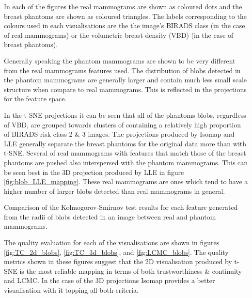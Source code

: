 In each of the figures the real mammograms are shown as coloured dots and the breast phantoms are shown as coloured triangles. The labels corresponding to the colours used in each visualisations are the the image's BIRADS class (in the case of real mammograms) or the volumetric breast density (VBD) (in the case of breast phantoms).

Generally speaking the phantom mammograms are shown to be very different from the real mammograms features used. The distribution of blobs detected in the phantom mammograms are generally larger and contain much less small scale structure when compare to real mammograms. This is reflected in the projections for the feature space. 

In the t-SNE projections it can be seen that all of the phantoms blobs, regardless of VBD, are grouped towards clusters of containing a relatively high proportion of BIRADS risk class 2 \& 3 images. The projections produced by Isomap and LLE generally separate the breast phantoms for the original data more than with t-SNE. Several of real mammograms with features that match those of the breast phantoms are pushed also interspersed with the phantom mammograms. This can be seen best in the 3D projection produced by LLE in figure \ref{fig:blob_LLE_mapping}. These real mammograms are ones which tend to have a higher number of larger blobs detected than real mammograms in general.

\begin{table}[H]
\label{table:blob_features_ks}
\centering
{}
\caption{Comparison of the Kolmogorov-Smirnov test results for each feature generated from the radii of blobs detected in an image between real and phantom mammograms.}
\end{table}

The quality evaluation for each of the visualisations are shown in figures \ref{fig:TC_2d_blobs}, \ref{fig:TC_3d_blobs}, and \ref{fig:LCMC_blobs}. The quality metrics shown in these figures suggest that the 2D visualisation produced by t-SNE is the most reliable mapping in terms of both trustworthiness \& continuity and LCMC. In the case of the 3D projections Isomap provides a better visualisation with it topping all both criteria.

\clearpage

